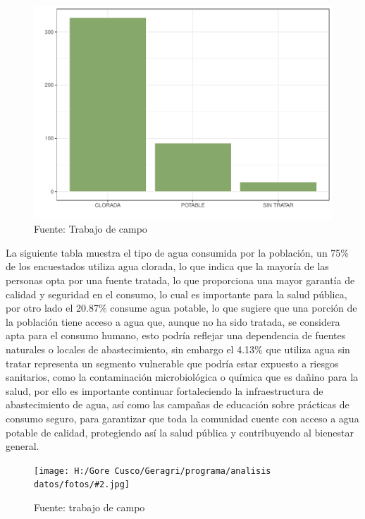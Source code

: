 \documentclass{article}\usepackage[]{graphicx}\usepackage[table]{xcolor}
\makeatletter
\def\maxwidth{ %
  \ifdim\Gin@nat@width>\linewidth
    \linewidth
  \else
    \Gin@nat@width
  \fi
}
\newenvironment{knitrout}{}{} %
\newenvironment{fotos}[2]
{\begin{figure}[H]
	\centering
	\caption{#1}
	\texttt{[image: H:/Gore Cusco/Geragri/programa/analisis datos/fotos/\#2.jpg]}
	\caption*{Fuente: trabajo de campo}}
{\end{figure}}
\makeatother
\begin{document}
\begin{figure}[H]
  \centering
  \caption{Tipo de agua que consume}
\begin{knitrout}
\color{fgcolor}
\includegraphics[width=\maxwidth]{figure/fig_diez-1} 
\end{knitrout}
  \caption*{Fuente: Trabajo de campo}
\end{figure}
La siguiente tabla muestra el tipo de agua consumida por la población, un 75\% de los encuestados utiliza agua clorada, lo que indica que la mayoría de las personas opta por una fuente tratada, lo que proporciona una mayor garantía de calidad y seguridad en el consumo, lo cual es importante  para la salud pública, por otro lado el 20.87\% consume agua potable, lo que sugiere que una porción de la población tiene acceso a agua que, aunque no ha sido tratada, se considera apta para el consumo humano, esto podría reflejar una dependencia de fuentes naturales o locales de abastecimiento, sin embargo el 4.13\% que utiliza agua sin tratar representa un segmento vulnerable que podría estar expuesto a riesgos sanitarios, como la contaminación microbiológica o química que es dañino para la salud, por ello es importante continuar fortaleciendo la infraestructura de abastecimiento de agua, así como las campañas de educación sobre prácticas de consumo seguro, para garantizar que toda la comunidad cuente con acceso a agua potable de calidad, protegiendo así la salud pública y contribuyendo al bienestar general.
\begin{fotos}
{sensibilizacion a la poblacion}{8}
\end{fotos}
\end{document}
